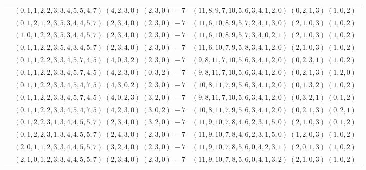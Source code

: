 \documentclass[11pt]{article}
\begin{document}
\begin{longtable}[l]{|c|c|c|}
 \cline{2-3} 
 & $(0 ,1 ,1 ,2 ,2 ,3 ,3 ,4 ,5 ,5 ,4 ,7) \;(4 ,2 ,3 ,0) \;(2 ,3 ,0) \;-7$ & $(11 ,8 ,9 ,7 ,10 ,5 ,6 ,3 ,4 ,1 ,2 ,0) \;(0 ,2 ,1 ,3) \;(1 ,0 ,2) \;$\\ 
 \cline{2-3} 
 & $(0 ,1 ,2 ,1 ,2 ,3 ,5 ,3 ,4 ,4 ,5 ,7) \;(2 ,3 ,4 ,0) \;(2 ,3 ,0) \;-7$ & $(11 ,6 ,10 ,8 ,9 ,5 ,7 ,2 ,4 ,1 ,3 ,0) \;(2 ,1 ,0 ,3) \;(1 ,0 ,2) \;$\\ 
 \cline{2-3} 
 & $(1 ,0 ,1 ,2 ,2 ,3 ,5 ,3 ,4 ,4 ,5 ,7) \;(2 ,3 ,4 ,0) \;(2 ,3 ,0) \;-7$ & $(11 ,6 ,10 ,8 ,9 ,5 ,7 ,3 ,4 ,0 ,2 ,1) \;(2 ,1 ,0 ,3) \;(1 ,0 ,2) \;$\\ 
 \cline{2-3} 
 & $(0 ,1 ,1 ,2 ,2 ,3 ,5 ,4 ,3 ,4 ,5 ,7) \;(2 ,3 ,4 ,0) \;(2 ,3 ,0) \;-7$ & $(11 ,6 ,10 ,7 ,9 ,5 ,8 ,3 ,4 ,1 ,2 ,0) \;(2 ,1 ,0 ,3) \;(1 ,0 ,2) \;$\\ 
 \cline{2-3} 
 & $(0 ,1 ,1 ,2 ,2 ,3 ,3 ,4 ,5 ,7 ,4 ,5) \;(4 ,0 ,3 ,2) \;(2 ,3 ,0) \;-7$ & $(9 ,8 ,11 ,7 ,10 ,5 ,6 ,3 ,4 ,1 ,2 ,0) \;(0 ,2 ,3 ,1) \;(1 ,0 ,2) \;$\\ 
 \cline{2-3} 
 & $(0 ,1 ,1 ,2 ,2 ,3 ,3 ,4 ,5 ,7 ,4 ,5) \;(4 ,2 ,3 ,0) \;(0 ,3 ,2) \;-7$ & $(9 ,8 ,11 ,7 ,10 ,5 ,6 ,3 ,4 ,1 ,2 ,0) \;(0 ,2 ,1 ,3) \;(1 ,2 ,0) \;$\\ 
 \cline{2-3} 
 & $(0 ,1 ,1 ,2 ,2 ,3 ,3 ,4 ,5 ,4 ,7 ,5) \;(4 ,3 ,0 ,2) \;(2 ,3 ,0) \;-7$ & $(10 ,8 ,11 ,7 ,9 ,5 ,6 ,3 ,4 ,1 ,2 ,0) \;(0 ,1 ,3 ,2) \;(1 ,0 ,2) \;$\\ 
 \cline{2-3} 
 & $(0 ,1 ,1 ,2 ,2 ,3 ,3 ,4 ,5 ,7 ,4 ,5) \;(4 ,0 ,2 ,3) \;(3 ,2 ,0) \;-7$ & $(9 ,8 ,11 ,7 ,10 ,5 ,6 ,3 ,4 ,1 ,2 ,0) \;(0 ,3 ,2 ,1) \;(0 ,1 ,2) \;$\\ 
 \cline{2-3} 
 & $(0 ,1 ,1 ,2 ,2 ,3 ,3 ,4 ,5 ,4 ,7 ,5) \;(4 ,2 ,3 ,0) \;(3 ,0 ,2) \;-7$ & $(10 ,8 ,11 ,7 ,9 ,5 ,6 ,3 ,4 ,1 ,2 ,0) \;(0 ,2 ,1 ,3) \;(0 ,2 ,1) \;$\\ 
 \cline{2-3} 
 & $(0 ,1 ,2 ,2 ,3 ,1 ,3 ,4 ,4 ,5 ,5 ,7) \;(2 ,3 ,4 ,0) \;(3 ,2 ,0) \;-7$ & $(11 ,9 ,10 ,7 ,8 ,4 ,6 ,2 ,3 ,1 ,5 ,0) \;(2 ,1 ,0 ,3) \;(0 ,1 ,2) \;$\\ 
 \cline{2-3} 
 & $(0 ,1 ,2 ,2 ,3 ,1 ,3 ,4 ,4 ,5 ,5 ,7) \;(2 ,4 ,3 ,0) \;(2 ,3 ,0) \;-7$ & $(11 ,9 ,10 ,7 ,8 ,4 ,6 ,2 ,3 ,1 ,5 ,0) \;(1 ,2 ,0 ,3) \;(1 ,0 ,2) \;$\\ 
 \cline{2-3} 
 & $(2 ,0 ,1 ,1 ,2 ,3 ,3 ,4 ,4 ,5 ,5 ,7) \;(3 ,2 ,4 ,0) \;(2 ,3 ,0) \;-7$ & $(11 ,9 ,10 ,7 ,8 ,5 ,6 ,0 ,4 ,2 ,3 ,1) \;(2 ,0 ,1 ,3) \;(1 ,0 ,2) \;$\\ 
 \cline{2-3} 
 & $(2 ,1 ,0 ,1 ,2 ,3 ,3 ,4 ,4 ,5 ,5 ,7) \;(2 ,3 ,4 ,0) \;(2 ,3 ,0) \;-7$ & $(11 ,9 ,10 ,7 ,8 ,5 ,6 ,0 ,4 ,1 ,3 ,2) \;(2 ,1 ,0 ,3) \;(1 ,0 ,2) \;$\\ 

\end{longtable}
\end{document}
